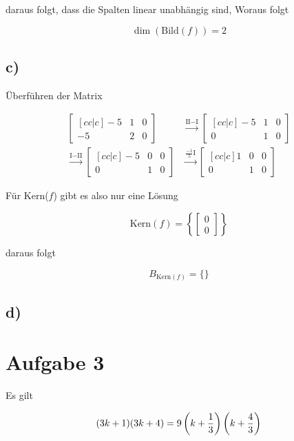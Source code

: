 \documentclass[a4paper, 11pt]{article}
\begin{document}
daraus folgt, dass die Spalten linear unabhängig sind, Woraus folgt

$$ \dim(\text{Bild}(f)) = 2 $$

\subsection{c)}
\label{sec:org0fd53e0}
Überführen der Matrix

\begin{align*}
    \begin{bmatrix}[cc|c]
        -5 & 1 & 0 \\
        -5 & 2 & 0
    \end{bmatrix}
    &\xrightarrow{\text{II} - \text{I}}
    \begin{bmatrix}[cc|c]
        -5 & 1 & 0 \\
        0 & 1 & 0
    \end{bmatrix} \\
    \xrightarrow{\text{I} - \text{II}}
    \begin{bmatrix}[cc|c]
        -5 & 0 & 0 \\
        0 & 1 & 0
    \end{bmatrix}
    &\xrightarrow{ \frac{-1}{5}\text{I}}
    \begin{bmatrix}[cc|c]
        1 & 0 & 0 \\
        0 & 1 & 0
    \end{bmatrix}
\end{align*}

Für Kern(\(f\)) gibt es also nur eine Lösung

$$ \text{Kern}(f) = \left\{ \begin{bmatrix} 0 \\ 0 \end{bmatrix} \right\} $$

daraus folgt

$$ B_{\text{Kern}(f)} = \{\} $$

\subsection{d)}
\label{sec:org5eab8cf}

\section{Aufgabe 3}
\label{sec:org47d8294}
Es gilt

$$ (3k + 1)(3k + 4) =
    9 \left(k + \frac{1}{3}\right) \left(k + \frac{4}{3}\right) $$
\end{document}
